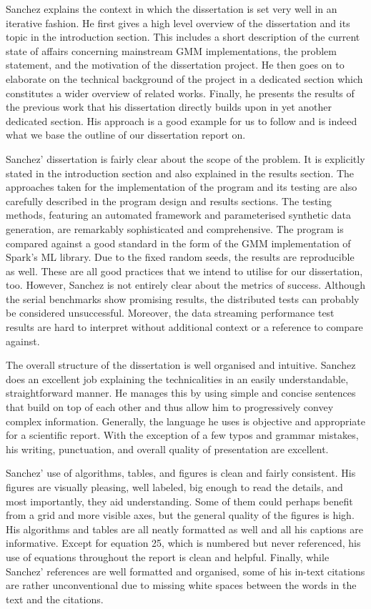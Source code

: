 \documentclass{article}
\begin{document}
Sanchez explains the context in which the dissertation is set very well in an iterative fashion. He first gives a high level overview of the dissertation and its topic in the introduction section. This includes a short description of the current state of affairs concerning mainstream GMM implementations, the problem statement, and the motivation of the dissertation project. He then goes on to elaborate on the technical background of the project in a dedicated section which constitutes a wider overview of related works. Finally, he presents the results of the previous work that his dissertation directly builds upon in yet another dedicated section. His approach is a good example for us to follow and is indeed what we base the outline of our dissertation report on.

Sanchez' dissertation is fairly clear about the scope of the problem. It is explicitly stated in the introduction section and also explained in the results section. The approaches taken for the implementation of the program and its testing are also carefully described in the program design and results sections. The testing methods, featuring an automated framework and parameterised synthetic data generation, are remarkably sophisticated and comprehensive. The program is compared against a good standard in the form of the GMM implementation of Spark's ML library. Due to the fixed random seeds, the results are reproducible as well. These are all good practices that we intend to utilise for our dissertation, too. However, Sanchez is not entirely clear about the metrics of success. Although the serial benchmarks show promising results, the distributed tests can probably be considered unsuccessful. Moreover, the data streaming performance test results are hard to interpret without additional context or a reference to compare against.

The overall structure of the dissertation is well organised and intuitive. Sanchez does an excellent job explaining the technicalities in an easily understandable, straightforward manner. He manages this by using simple and concise sentences that build on top of each other and thus allow him to progressively convey complex information. Generally, the language he uses is objective and appropriate for a scientific report. With the exception of a few typos and grammar mistakes, his writing, punctuation, and overall quality of presentation are excellent.

Sanchez' use of algorithms, tables, and figures is clean and fairly consistent. His figures are visually pleasing, well labeled, big enough to read the details, and most importantly, they aid understanding. Some of them could perhaps benefit from a grid and more visible axes, but the general quality of the figures is high. His algorithms and tables are all neatly formatted as well and all his captions are informative. Except for equation 25, which is numbered but never referenced, his use of equations throughout the report is clean and helpful. Finally, while Sanchez' references are well formatted and organised, some of his in-text citations are rather unconventional due to missing white spaces between the words in the text and the citations.



\pagebreak



\end{document}
